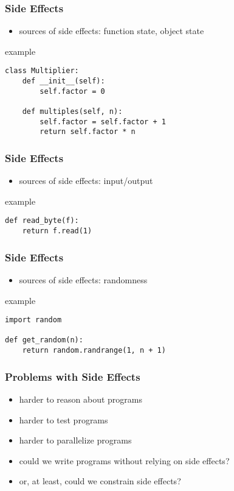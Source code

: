 \documentclass[dvipsnames]{beamer}
\theoremstyle{plain}
\begin{document}
\begin{frame}[fragile]
  \frametitle{Side Effects}

  \begin{itemize}
    \item sources of side effects: function state, object state
  \end{itemize}

  \begin{exampleblock}{example}
    \begin{lstlisting}
class Multiplier:
    def __init__(self):
        self.factor = 0

    def multiples(self, n):
        self.factor = self.factor + 1
        return self.factor * n
    \end{lstlisting}
  \end{exampleblock}
\end{frame}

\begin{frame}[fragile]
  \frametitle{Side Effects}

  \begin{itemize}
    \item sources of side effects: input/output
  \end{itemize}

  \begin{exampleblock}{example}
    \begin{lstlisting}
def read_byte(f):
    return f.read(1)
    \end{lstlisting}
  \end{exampleblock}
\end{frame}

\begin{frame}[fragile]
  \frametitle{Side Effects}

  \begin{itemize}
    \item sources of side effects: randomness
  \end{itemize}

  \begin{exampleblock}{example}
    \begin{lstlisting}
import random

def get_random(n):
    return random.randrange(1, n + 1)
    \end{lstlisting}
  \end{exampleblock}
\end{frame}

\begin{frame}
  \frametitle{Problems with Side Effects}

  \begin{itemize}
    \item harder to reason about programs
    \item harder to test programs
    \item harder to parallelize programs

    \pause
    \bigskip
    \item could we write programs without relying on side effects?
    \item or, at least, could we constrain side effects?
  \end{itemize}
\end{frame}
\end{document}
